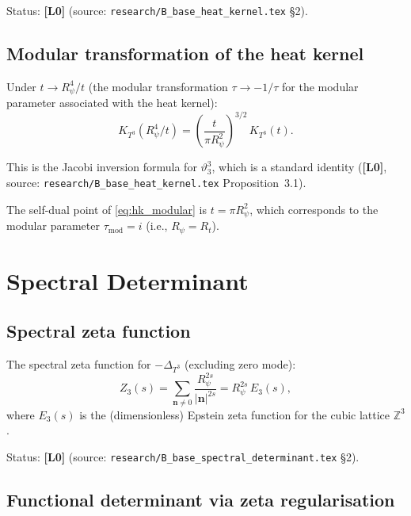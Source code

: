 \documentclass[11pt,a4paper]{article}
\newcommand{\Lzero}{\textbf{[L0]}}
\begin{document}
Status: \Lzero{} (source: \texttt{research/B\_base\_heat\_kernel.tex} §2).

\subsection{Modular transformation of the heat kernel}

Under $t\to R_\psi^4/t$ (the modular transformation $\tau\to -1/\tau$ for
the modular parameter associated with the heat kernel):
\begin{equation}
\label{eq:hk_modular}
  K_{T^3}(R_\psi^4/t)
  = \left(\frac{t}{\pi R_\psi^2}\right)^{3/2}\,K_{T^3}(t).
\end{equation}

This is the Jacobi inversion formula for $\vartheta_3^3$, which is a standard
identity (\Lzero, source: \texttt{research/B\_base\_heat\_kernel.tex}
Proposition~3.1).

The self-dual point of \eqref{eq:hk_modular} is $t = \pi R_\psi^2$, which
corresponds to the modular parameter $\tau_{\mathrm{mod}} = i$ (i.e.,
$R_\psi = R_t$).

\section{Spectral Determinant}
\label{sec:spec_det}

\subsection{Spectral zeta function}

The spectral zeta function for $-\Delta_{T^3}$ (excluding zero mode):
\begin{equation}
\label{eq:spec_zeta}
  Z_3(s) = \sum_{\mathbf{n}\neq 0}
  \frac{R_\psi^{2s}}{|\mathbf{n}|^{2s}}
  = R_\psi^{2s}\,E_3(s),
\end{equation}
where $E_3(s)$ is the (dimensionless) Epstein zeta function for the cubic
lattice $\mathbb{Z}^3$.

Status: \Lzero{} (source: \texttt{research/B\_base\_spectral\_determinant.tex} §2).

\subsection{Functional determinant via zeta regularisation}
\end{document}
